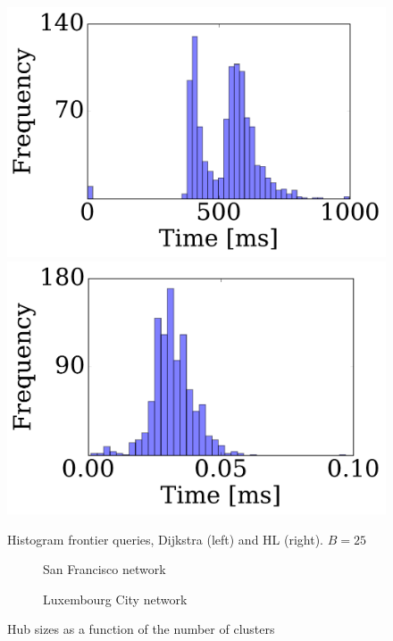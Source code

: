\begin{figure}
\begin{center}
\includegraphics[clip, trim=0.2cm 0.3cm 0.2cm 0.2cm,scale=0.26]{TexImg/SF_query_dij_B25.pdf}
\includegraphics[clip, trim=1.3cm 0.3cm 0.2cm 0.2cm,scale=0.26]{TexImg/SF_query_hl_B25.pdf}
\end{center}
\caption{Histogram frontier queries, Dijkstra (left) and HL (right). $B=25$}\label{fig:SF_query}
\end{figure}



\begin{figure}
\hfill
\begin{subfigure}{0.45\textwidth}

\caption{San Francisco network}\label{fig:clusters_sf}
\end{subfigure}
\begin{subfigure}{0.45\textwidth}

\caption{Luxembourg City network}\label{fig:clusters_lu}
\end{subfigure}
\caption{Hub sizes as a function of the number of clusters}\label{fig:clusters}
\end{figure}

